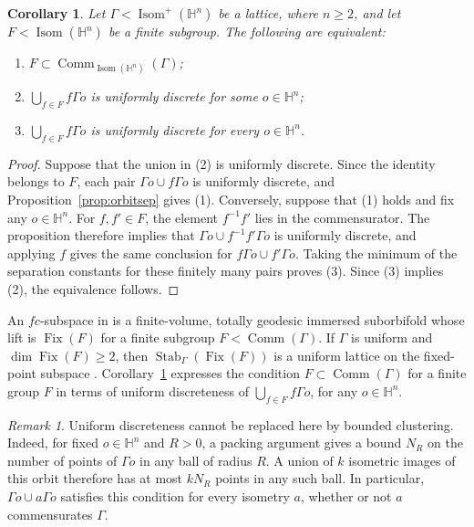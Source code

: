 \documentclass[reqno]{amsart}
\newtheorem{corollary}[theorem]{Corollary}
\theoremstyle{remark}
\newtheorem{remark}[theorem]{Remark}
\DeclareMathOperator{\Comm}{Comm}
\begin{document}
\begin{corollary}\label{cor:finiteorbits}
Let $\Gamma<\operatorname{Isom}^+(\mathbb H^n)$ be a lattice, where $n\ge2$, and let $F<\operatorname{Isom}(\mathbb H^n)$ be a finite subgroup. The following are equivalent:
\begin{enumerate}
\item $F\subset\Comm_{\operatorname{Isom}(\mathbb H^n)}(\Gamma)$;
\item $\bigcup_{f\in F}f\Gamma o$ is uniformly discrete for some $o\in\mathbb H^n$;
\item $\bigcup_{f\in F}f\Gamma o$ is uniformly discrete for every $o\in\mathbb H^n$.
\end{enumerate}
\end{corollary}

\begin{proof}
Suppose that the union in (2) is uniformly discrete. Since the identity belongs to $F$, each pair $\Gamma o\cup f\Gamma o$ is uniformly discrete, and Proposition~\ref{prop:orbitsep} gives (1). Conversely, suppose that (1) holds and fix any $o\in\mathbb H^n$. For $f,f'\in F$, the element $f^{-1}f'$ lies in the commensurator. The proposition therefore implies that $\Gamma o\cup f^{-1}f'\Gamma o$ is uniformly discrete, and applying $f$ gives the same conclusion for $f\Gamma o\cup f'\Gamma o$. Taking the minimum of the separation constants for these finitely many pairs proves (3). Since (3) implies (2), the equivalence follows.
\end{proof}



An $fc$-subspace in \cite[Definition~1.1]{BBKS} is a finite-volume, totally geodesic immersed suborbifold whose lift is $\operatorname{Fix}(F)$ for a finite subgroup $F<\Comm(\Gamma)$. If $\Gamma$ is uniform and $\dim\operatorname{Fix}(F)\ge2$, then $\operatorname{Stab}_\Gamma(\operatorname{Fix}(F))$ is a uniform lattice on the fixed-point subspace \cite[Theorem~1.2]{BBKS}. Corollary~\ref{cor:finiteorbits} expresses the condition $F\subset\Comm(\Gamma)$ for a finite group $F$ in terms of uniform discreteness of $\bigcup_{f\in F}f\Gamma o$, for any $o\in\mathbb H^n$.

\begin{remark}
Uniform discreteness cannot be replaced here by bounded clustering. Indeed, for fixed $o\in\mathbb H^n$ and $R>0$, a packing argument gives a bound $N_R$ on the number of points of $\Gamma o$ in any ball of radius $R$. A union of $k$ isometric images of this orbit therefore has at most $kN_R$ points in any such ball. In particular, $\Gamma o\cup a\Gamma o$ satisfies this condition for every isometry $a$, whether or not $a$ commensurates $\Gamma$.
\end{remark}
\end{document}

